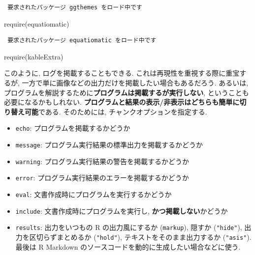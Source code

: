 \documentclass[
  xelatex,ja=standard,jafont=noto]{bxjsbook}
\newenvironment{Shaded}{\begin{snugshade}}{\end{snugshade}}
\newcommand{\FunctionTok}[1]{\textcolor[rgb]{0.00,0.00,0.00}{#1}}
\newcommand{\NormalTok}[1]{#1}
\providecommand{\tightlist}{%
  \setlength{\itemsep}{0pt}\setlength{\parskip}{0pt}}
\theoremstyle{definition}
\theoremstyle{definition}
\theoremstyle{definition}
\theoremstyle{definition}
\theoremstyle{remark}
\begin{document}
\begin{verbatim}
 要求されたパッケージ ggthemes をロード中です 
\end{verbatim}

\begin{Shaded}
\begin{Highlighting}[numbers=left,,]
\FunctionTok{require}\NormalTok{(equatiomatic)}
\end{Highlighting}
\end{Shaded}

\begin{verbatim}
 要求されたパッケージ equatiomatic をロード中です 
\end{verbatim}

\begin{Shaded}
\begin{Highlighting}[numbers=left,,]
\FunctionTok{require}\NormalTok{(kableExtra)}
\end{Highlighting}
\end{Shaded}

このように, ログを掲載することもできる.
これは再現性を重視する際に重宝するが,
一方で単に画像などの出力だけを掲載したい場合もあるだろう. あるいは,
プログラムを解説するために\textbf{プログラムは掲載するが実行しない},
ということも必要になるかもしれない.
\textbf{プログラムと結果の表示/非表示はどちらも簡単に切り替え可能}である.
そのためには, チャンクオプションを指定する.

\begin{itemize}
\tightlist
\item
  \texttt{echo}: プログラムを掲載するかどうか
\item
  \texttt{message}: プログラム実行結果の標準出力を掲載するかどうか
\item
  \texttt{warning}: プログラム実行結果の警告を掲載するかどうか
\item
  \texttt{error}: プログラム実行結果のエラーを掲載するかどうか
\item
  \texttt{eval}: 文書作成時にプログラムを実行するかどうか
\item
  \texttt{include}: 文書作成時にプログラムを実行し,
  \textbf{かつ掲載しない}かどうか
\item
  \texttt{results}: 出力をいつもの R の出力風にするか (\texttt{markup}),
  隠すか (\texttt{"hide"}), 出力を区切らずまとめるか (\texttt{"hold"}),
  テキストをそのまま出力するか (\texttt{"asis"}). 最後は R Markdown
  のソースコードを動的に生成したい場合などに使う.
\end{itemize}
\end{document}

